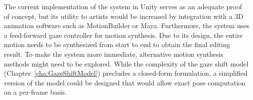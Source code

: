 The current implementation of the system in Unity serves as an adequate proof of concept, but its utility to artists would be increased by integration with a 3D animation software such as MotionBuilder or Maya. Furthermore, the system uses a feed-forward gaze controller for motion synthesis. Due to its design, the entire motion needs to be synthesized from start to end to obtain the final editing result. To make the system more immediate, alternative motion synthesis methods might need to be explored. While the complexity of the gaze shift model (Chapter~\ref{cha:GazeShiftModel}) precludes a closed-form formulation, a simplified version of the model could be designed that would allow exact pose computation on a per-frame basis.
